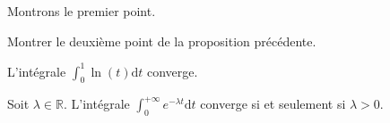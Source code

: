 \documentclass[french,11pt,twoside]{VcCours}
\newcommand{\dt}{\text{d}t}
\begin{document}
\begin{Demonstration}{} Montrons le premier point.

%

\newpage
\vspace*{5cm}
\end{Demonstration}

\begin{ApplicationDirecte}{} Montrer le deuxième point de la proposition précédente.
\end{ApplicationDirecte}

\begin{Proposition}{} L'intégrale $\int_{0}^1 \ln(t) \dt$ converge.
\end{Proposition}

\begin{Proposition}{}
Soit $\lambda \in \mathbb{R}$. L'intégrale $\int_0^{+\infty} e^{-\lambda t} \dt$ converge si et seulement si $\lambda > 0$.
\end{Proposition}
\end{document}
